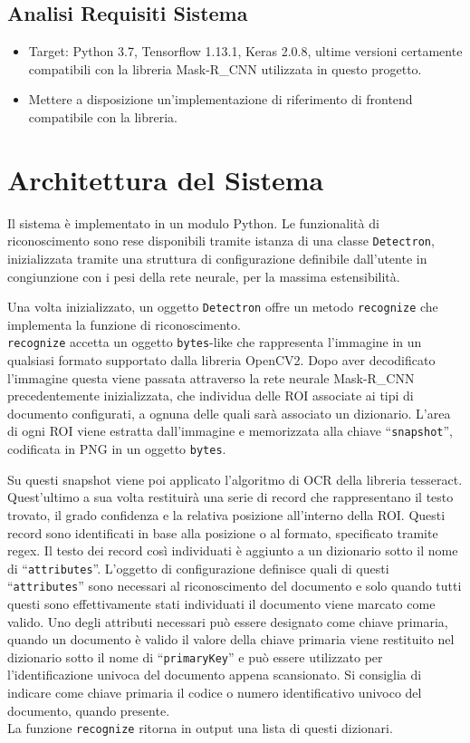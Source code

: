 \documentclass[12pt,a4paper]{article}
\begin{document}
\subsection{Analisi Requisiti Sistema}

\begin{itemize}
    \item Target: Python 3.7, Tensorflow 1.13.1, Keras 2.0.8, ultime
        versioni certamente compatibili con la libreria Mask-R\_CNN
        utilizzata in questo progetto.
    \item Mettere a disposizione un'implementazione di riferimento di
        frontend compatibile con la libreria.
\end{itemize}

\section{Architettura del Sistema}

Il sistema è implementato in un modulo Python. Le funzionalità di
riconoscimento sono rese disponibili tramite istanza di una classe
\texttt{Detectron}, inizializzata tramite una struttura di
configurazione definibile dall'utente in congiunzione con i pesi della
rete neurale, per la massima estensibilità.

Una volta inizializzato, un oggetto \texttt{Detectron} offre un metodo
\texttt{recognize} che implementa la funzione di riconoscimento.\\
\texttt{recognize} accetta un oggetto \texttt{bytes}-like che
rappresenta l'immagine in un qualsiasi formato supportato dalla libreria
OpenCV2. Dopo aver decodificato l'immagine questa viene passata
attraverso la rete neurale Mask-R\_CNN precedentemente inizializzata, che
individua delle ROI associate ai tipi di documento configurati, a ognuna
delle quali sarà associato un dizionario. L'area di ogni ROI viene
estratta dall'immagine e memorizzata alla chiave ``\texttt{snapshot}'',
codificata in PNG in un oggetto \texttt{bytes}.

Su questi snapshot viene poi applicato l'algoritmo di OCR della libreria
tesseract. Quest'ultimo a sua volta restituirà una serie di record che
rappresentano il testo trovato, il grado confidenza e la relativa
posizione all'interno della ROI. Questi record sono identificati in base
alla posizione o al formato, specificato tramite regex. Il testo dei
record così individuati è aggiunto a un dizionario sotto il nome di
``\texttt{attributes}''. L'oggetto di configurazione definisce quali di
questi ``\texttt{attributes}'' sono necessari al riconoscimento del
documento e solo quando tutti questi sono effettivamente stati
individuati il documento viene marcato come valido. Uno degli attributi
necessari può essere designato come chiave primaria, quando un documento
è valido il valore della chiave primaria viene restituito nel dizionario
sotto il nome di ``\texttt{primaryKey}'' e può essere utilizzato per
l'identificazione univoca del documento appena scansionato. Si consiglia
di indicare come chiave primaria il codice o numero identificativo
univoco del documento, quando presente.\\
La funzione \texttt{recognize} ritorna in output una lista di questi
dizionari.
\end{document}

